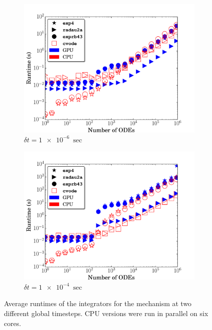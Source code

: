\documentclass[preprint]{elsarticle}
\begin{document}
\begin{figure}[htb]
  \centering
  \begin{subfigure}{0.49\textwidth}
      \includegraphics[width=\linewidth]{H2_1e-06_cpuvsgpu.pdf}
      \caption{$\delta t = \SI{1e-6}{\sec}$}   
  \end{subfigure}
  \begin{subfigure}{0.49\textwidth}
      \includegraphics[width=\linewidth]{H2_1e-04_cpuvsgpu.pdf}
      \caption{$\delta t = \SI{1e-4}{\sec}$}
  \end{subfigure}
  \caption{Average runtimes of the integrators for the  mechanism at two different global timesteps. 
  CPU versions were run in parallel on six cores.}
  \label{F:H2_perf}
\end{figure}
\end{document}
